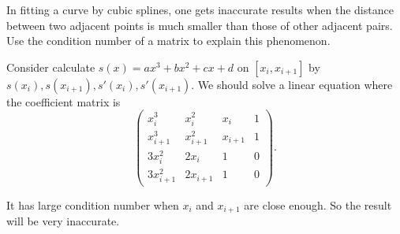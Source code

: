 \documentclass[11pt]{elegantbook}
\begin{document}
\vspace{1em}

\begin{problem}
  In fitting a curve by cubic splines, one gets inaccurate results when the distance between two adjacent points is much smaller than those of other adjacent pairs. Use the condition number of a matrix to explain this phenomenon.
\end{problem}

\begin{solution}
  Consider calculate $s(x)=ax^3+bx^2+cx+d$ on $[x_i,x_{i+1}]$ by $s(x_i),s(x_{i+1}),s'(x_i),s'(x_{i+1})$. We should solve a linear equation where the coefficient matrix is
  \begin{equation*}
    \begin{pmatrix}
      x_i^3 & x_i^2 & x_i & 1\\
      x_{i+1}^3 & x_{i+1} ^2 & x_{i+1} & 1\\
      3x_i^2 & 2x_i & 1 & 0\\
      3x_{i+1}^2 & 2x_{i+1} & 1 & 0
    \end{pmatrix}.
  \end{equation*}

  It has large condition number when $x_i$ and $x_{i+1}$ are close enough. So the result will be very inaccurate.
\end{solution}
\end{document}
